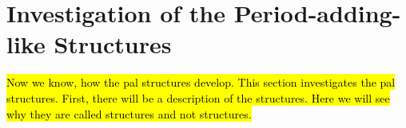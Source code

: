 \section{Investigation of the Period-adding-like Structures}
\label{sec:add.add}

\hl{
	Now we know, how the \gls{pal} structures develop.
	This section investigates the \gls{pal} structures.
	First, there will be a description of the structures.
	Here we will see why they are called  structures and not  structures.
}


\clearpage



